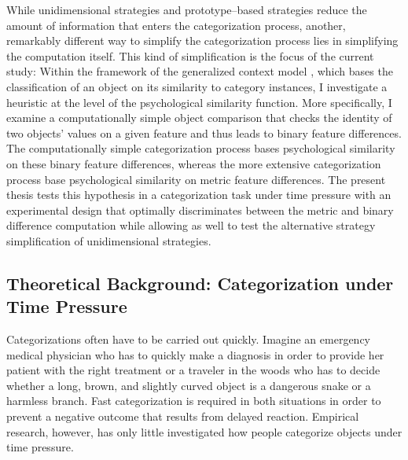 \documentclass[a4paper,man,natbib]{apa6}
\begin{document}
While unidimensional strategies and prototype--based strategies reduce the amount of information that enters the categorization process, another, remarkably different way to simplify the categorization process lies in simplifying the computation itself. This kind of simplification is the focus of the current study: Within the framework of the generalized context model \citep{nosofsky1986attention}, which bases the classification of an object on its similarity to category instances, I investigate a heuristic at the level of the psychological similarity function.
More specifically, I examine a computationally simple object comparison that checks the identity of two objects' values on a given feature and thus leads to binary feature differences. The computationally simple categorization process bases psychological similarity on these binary feature differences, whereas the more extensive categorization process base psychological similarity on metric feature differences. The present thesis tests this hypothesis in a categorization task under time pressure with an experimental design that optimally discriminates between the metric and binary difference computation while allowing as well to test the alternative strategy simplification of unidimensional strategies. 


\subsection{Theoretical Background: Categorization under Time Pressure}
Categorizations often have to be carried out quickly. Imagine an emergency medical physician who has to quickly make a diagnosis in order to provide her patient with the right treatment or a traveler in the woods who has to decide whether a long, brown, and slightly curved object is a dangerous snake or a harmless branch. Fast categorization is required in both situations in order to prevent a negative outcome that results from delayed reaction. Empirical research, however, has only little investigated how people categorize objects under time pressure. 
\end{document}
